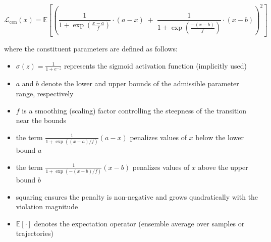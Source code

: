 \documentclass[11pt, oneside]{article}
\begin{document}

\begin{equation}
    \mathcal{L_{\mathrm{con}}}(x) = \mathbb{E}\left[\left(
        \frac{1}{1 + \exp\!\left(\tfrac{x-a}{f}\right)} \cdot (a-x) \;+\;
        \frac{1}{1 + \exp\!\left(\frac{-(x-b)}{f}\right)} \cdot (x-b)
        \right)^{2}\right]
\end{equation}

where the constituent parameters are defined as follows:
\begin{itemize}
    \item \(\sigma(z) = \tfrac{1}{1+e^{-z}}\) represents the sigmoid activation function (implicitly used)
    \item \(a\) and \(b\) denote the lower and upper bounds of the admissible parameter range, respectively
    \item \(f\) is a smoothing (scaling) factor controlling the steepness of the transition near the bounds
    \item the term \(\tfrac{1}{1+\exp((x-a)/f)}(a-x)\) penalizes values of \(x\) below the lower bound \(a\)
    \item the term \(\tfrac{1}{1+\exp(-(x-b)/f)}(x-b)\) penalizes values of \(x\) above the upper bound \(b\)
    \item squaring ensures the penalty is non-negative and grows quadratically with the violation magnitude
    \item \(\mathbb{E}[\cdot]\) denotes the expectation operator (ensemble average over samples or trajectories)
\end{itemize}
\end{document}
